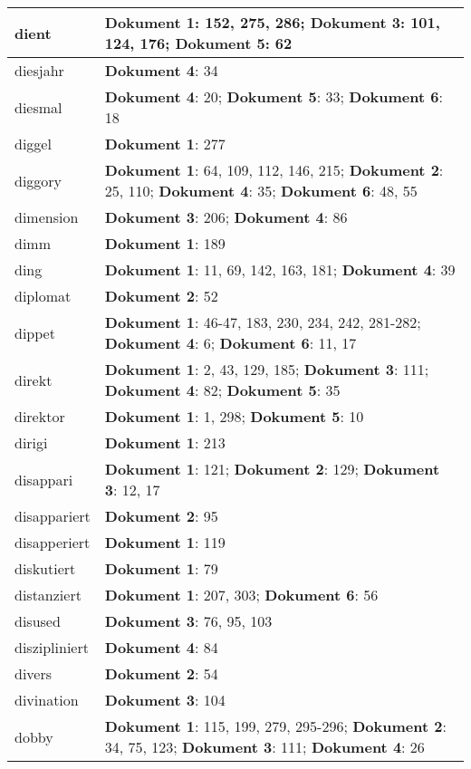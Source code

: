 \documentclass[a5paper]{article}
\begin{document}
\begin{longtable}[l]{|l|p{3in}|}
\hline
dient & \textbf{Dokument 1}: 152, 275, 286; \textbf{Dokument 3}: 101, 124, 176; \textbf{Dokument 5}: 62 \\
\hline
diesjahr & \textbf{Dokument 4}: 34 \\
\hline
diesmal & \textbf{Dokument 4}: 20; \textbf{Dokument 5}: 33; \textbf{Dokument 6}: 18 \\
\hline
diggel & \textbf{Dokument 1}: 277 \\
\hline
diggory & \textbf{Dokument 1}: 64, 109, 112, 146, 215; \textbf{Dokument 2}: 25, 110; \textbf{Dokument 4}: 35; \textbf{Dokument 6}: 48, 55 \\
\hline
dimension & \textbf{Dokument 3}: 206; \textbf{Dokument 4}: 86 \\
\hline
dimm & \textbf{Dokument 1}: 189 \\
\hline
ding & \textbf{Dokument 1}: 11, 69, 142, 163, 181; \textbf{Dokument 4}: 39 \\
\hline
diplomat & \textbf{Dokument 2}: 52 \\
\hline
dippet & \textbf{Dokument 1}: 46-47, 183, 230, 234, 242, 281-282; \textbf{Dokument 4}: 6; \textbf{Dokument 6}: 11, 17 \\
\hline
direkt & \textbf{Dokument 1}: 2, 43, 129, 185; \textbf{Dokument 3}: 111; \textbf{Dokument 4}: 82; \textbf{Dokument 5}: 35 \\
\hline
direktor & \textbf{Dokument 1}: 1, 298; \textbf{Dokument 5}: 10 \\
\hline
dirigi & \textbf{Dokument 1}: 213 \\
\hline
disappari & \textbf{Dokument 1}: 121; \textbf{Dokument 2}: 129; \textbf{Dokument 3}: 12, 17 \\
\hline
disappariert & \textbf{Dokument 2}: 95 \\
\hline
disapperiert & \textbf{Dokument 1}: 119 \\
\hline
diskutiert & \textbf{Dokument 1}: 79 \\
\hline
distanziert & \textbf{Dokument 1}: 207, 303; \textbf{Dokument 6}: 56 \\
\hline
disused & \textbf{Dokument 3}: 76, 95, 103 \\
\hline
diszipliniert & \textbf{Dokument 4}: 84 \\
\hline
divers & \textbf{Dokument 2}: 54 \\
\hline
divination & \textbf{Dokument 3}: 104 \\
\hline
dobby & \textbf{Dokument 1}: 115, 199, 279, 295-296; \textbf{Dokument 2}: 34, 75, 123; \textbf{Dokument 3}: 111; \textbf{Dokument 4}: 26 \\

\end{longtable}
\end{document}
